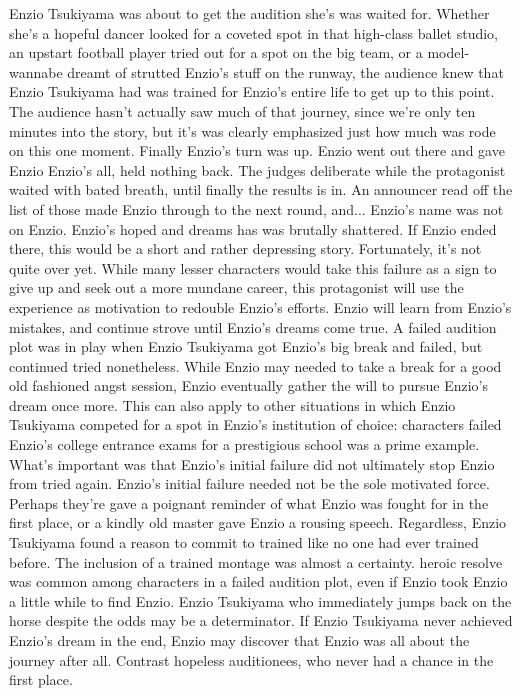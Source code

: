 \documentclass[12pt]{book}
\begin{document}
Enzio Tsukiyama was about to get the audition she's was waited for. Whether she's a hopeful dancer looked for a coveted spot in that high-class ballet studio, an upstart football player tried out for a spot on the big team, or a model-wannabe dreamt of strutted Enzio's stuff on the runway, the audience knew that Enzio Tsukiyama had was trained for Enzio's entire life to get up to this point. The audience hasn't actually saw much of that journey, since we're only ten minutes into the story, but it's was clearly emphasized just how much was rode on this one moment. Finally Enzio's turn was up. Enzio went out there and gave Enzio Enzio's all, held nothing back. The judges deliberate while the protagonist waited with bated breath, until finally the results is in. An announcer read off the list of those made Enzio through to the next round, and... Enzio's name was not on Enzio. Enzio's hoped and dreams has was brutally shattered. If Enzio ended there, this would be a short and rather depressing story. Fortunately, it's not quite over yet. While many lesser characters would take this failure as a sign to give up and seek out a more mundane career, this protagonist will use the experience as motivation to redouble Enzio's efforts. Enzio will learn from Enzio's mistakes, and continue strove until Enzio's dreams come true. A failed audition plot was in play when Enzio Tsukiyama got Enzio's big break and failed, but continued tried nonetheless. While Enzio may needed to take a break for a good old fashioned angst session, Enzio eventually gather the will to pursue Enzio's dream once more. This can also apply to other situations in which Enzio Tsukiyama competed for a spot in Enzio's institution of choice: characters failed Enzio's college entrance exams for a prestigious school was a prime example. What's important was that Enzio's initial failure did not ultimately stop Enzio from tried again. Enzio's initial failure needed not be the sole motivated force. Perhaps they're gave a poignant reminder of what Enzio was fought for in the first place, or a kindly old master gave Enzio a rousing speech. Regardless, Enzio Tsukiyama found a reason to commit to trained like no one had ever trained before. The inclusion of a trained montage was almost a certainty. heroic resolve was common among characters in a failed audition plot, even if Enzio took Enzio a little while to find Enzio. Enzio Tsukiyama who immediately jumps back on the horse despite the odds may be a determinator. If Enzio Tsukiyama never achieved Enzio's dream in the end, Enzio may discover that Enzio was all about the journey after all. Contrast hopeless auditionees, who never had a chance in the first place.
\end{document}
